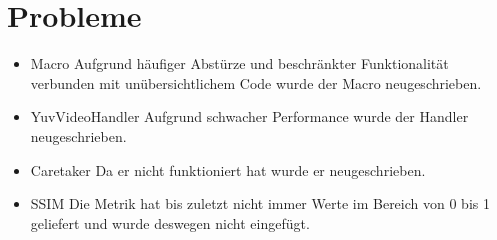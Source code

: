 \chapter{Probleme}
\begin{itemize}
\item Macro \newline
Aufgrund häufiger Abstürze und beschränkter Funktionalität verbunden mit unübersichtlichem Code wurde der Macro neugeschrieben.
\item YuvVideoHandler \newline
Aufgrund schwacher Performance wurde der Handler neugeschrieben.
\item Caretaker \newline
Da er nicht funktioniert hat wurde er neugeschrieben.
\item SSIM
Die Metrik hat bis zuletzt nicht immer Werte im Bereich von 0 bis 1 geliefert und wurde deswegen nicht eingefügt.
\end{itemize}